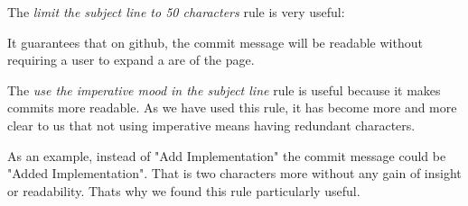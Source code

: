 The \emph{limit the subject line to 50 characters} rule is very useful:

It guarantees that on github, the commit message will be readable without requiring a user to expand a are of the page.

The \emph{use the imperative mood in the subject line} rule is useful because it makes commits more readable. As we have used this rule, it has become more and more clear to us that not using imperative means having redundant characters.

As an example, instead of "Add Implementation" the commit message could be "Added Implementation". That is two characters more without any gain of insight or readability. Thats why we found this rule particularly useful.

